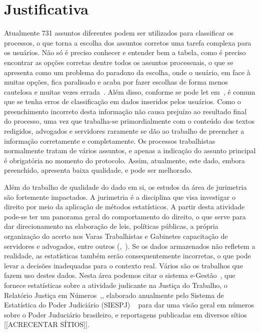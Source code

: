 \section{Justificativa}%
Atualmente 731 assuntos diferentes podem ser utilizados para classificar os processos, o que torna a escolha dos assuntos corretos uma tarefa complexa para os usuários. 
Não só é preciso conhecer e entender bem a tabela, como é preciso encontrar as opções corretas dentre todos os assuntos processuais, o que se apresenta como um problema do paradoxo da escolha, onde o usuário, em face à muitas opções, fica paralisado e acaba por fazer escolhas de forma menos cautelosa e muitas vezes errada~\cite{paradoxofchoice}. Além  disso, conforme se pode let em~\cite{mislabeled_survey}, é comum que se tenha erros de classificação em dados inseridos pelos usuários. 
Como o preenchimento incorreto desta informação não causa prejuízo ao resultado final do processo, uma vez que trabalha-se primordialmente com o conteúdo dos textos redigidos, advogados e servidores raramente se dão ao trabalho de preencher a informação corretamente e completamente. Os processos trabalhistas normalmente tratam de vários assuntos, e apenas a indicação do assunto principal é obrigatória no momento do protocolo. Assim, atualmente, este dado, embora preenchido, apresenta baixa qualidade, e pode ser melhorado.


Além do trabalho de qualidade do dado em si, os estudos da área de jurimetria são fortemente impactados. A jurimetria é a disciplina que visa investigar o direito por meio da aplicação de métodos estatísticos. 
A partir desta atividade pode-se ter um panorama geral do comportamento do direito, o que serve para dar direcionamento na elaboração de leis, políticas públicas, a própria organização do acerto nos Varas Trabalhistas e Gabinetes capacitação de servidores e advogados, entre outros (\cite{jurimetriaingles},~\cite{jurimetriaportugues}). Se os dados armazenados não refletem a realidade, as estatísticas também serão consequentemente incorretas, o que pode levar a decisões inadequadas para o contexto real. Vários são os trabalhos que fazem uso destes dados. Nesta área podemos citar o sistema e-Gestão~\cite{leiegestao}, que fornece estatísticas sobre a atividade judicante na Justiça do Trabalho,  o Relatório Justiça em Números~\cite{leijusticaemnumeros},\cite{leijusticaemnumeros}, elaborado anualmente pelo Sistema de Estatística do Poder Judiciário (SIESPJ) ~\cite{leisiespj} para dar uma visão geral em números sobre o Poder Juduciário brasileiro, e reportagens publicadas em diversos sítios [[ACRECENTAR SÍTIOS]].

